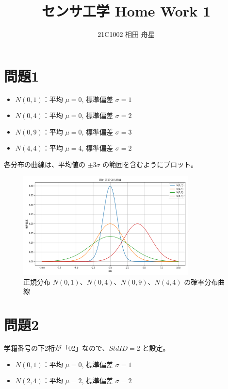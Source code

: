 \documentclass[a4paper,12pt]{article}
\begin{document}
\title{センサ工学 Home Work 1}
\author{21C1002 相田 舟星}
\date{}
\maketitle

\section*{問題1}

\begin{itemize}
    \item $N(0, 1)$：平均 $\mu=0$, 標準偏差 $\sigma=1$
    \item $N(0, 4)$：平均 $\mu=0$, 標準偏差 $\sigma=2$
    \item $N(0, 9)$：平均 $\mu=0$, 標準偏差 $\sigma=3$
    \item $N(4, 4)$：平均 $\mu=4$, 標準偏差 $\sigma=2$
\end{itemize}

各分布の曲線は、平均値の $\pm3\sigma$ の範囲を含むようにプロット。

\begin{figure}[H]
    \centering
    \includegraphics[width=0.8\textwidth]{Figure_1.png}
    \caption{正規分布 $N(0, 1)$、$N(0, 4)$、$N(0, 9)$、$N(4, 4)$ の確率分布曲線}
\end{figure}

\section*{問題2}

学籍番号の下2桁が「02」なので、$StdID = 2$ と設定。

\begin{itemize}
    \item $N(0, 1)$：平均 $\mu=0$, 標準偏差 $\sigma=1$
    \item $N(2, 4)$：平均 $\mu=2$, 標準偏差 $\sigma=2$
\end{itemize}
\end{document}
